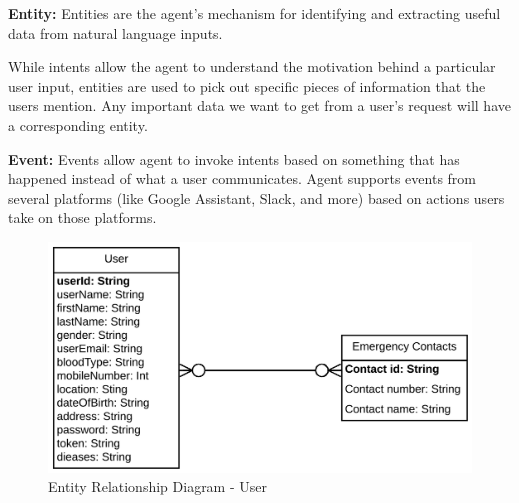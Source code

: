 \documentclass{scrreprt}
\begin{document}
\textbf{Entity:} Entities are the agent's mechanism for identifying and extracting useful data from natural language inputs.

While intents allow the agent to understand the motivation behind a particular user input, entities are used to pick out specific pieces of information that the users mention. Any important data we want to get from a user's request will have a corresponding entity.


\textbf{Event:} Events allow agent to invoke intents based on something that has happened instead of what a user communicates. Agent supports events from several platforms (like Google Assistant, Slack, and more) based on actions users take on those platforms.

\newpage

\begin{figure}[ht!]
    \centering
    \includegraphics[angle=0, width=\textwidth]{img3/erd1.pdf}
    \caption{Entity Relationship Diagram - User}
    \label{fig:erd1}
\end{figure}
\end{document}
